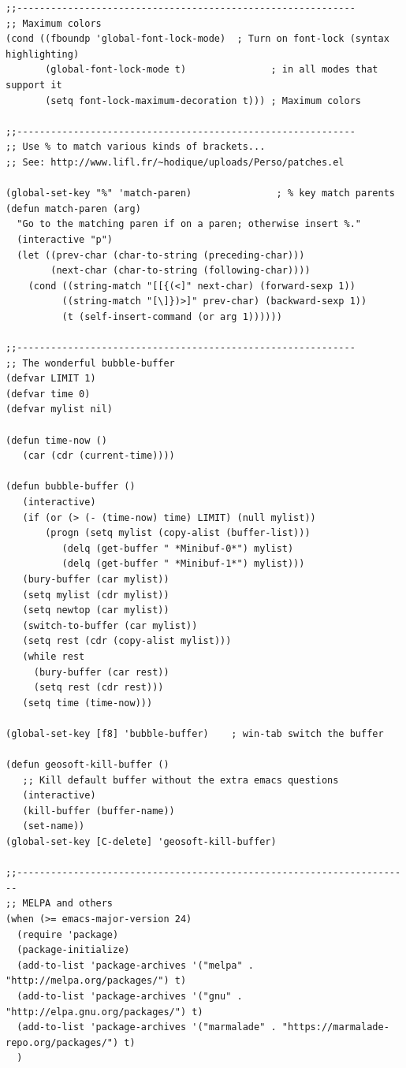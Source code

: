 \documentclass[12pt,spanish,]{article}
\begin{document}
\begin{verbatim}
;;------------------------------------------------------------
;; Maximum colors
(cond ((fboundp 'global-font-lock-mode)  ; Turn on font-lock (syntax highlighting)
       (global-font-lock-mode t)               ; in all modes that support it
       (setq font-lock-maximum-decoration t))) ; Maximum colors

;;------------------------------------------------------------
;; Use % to match various kinds of brackets...
;; See: http://www.lifl.fr/~hodique/uploads/Perso/patches.el

(global-set-key "%" 'match-paren)               ; % key match parents
(defun match-paren (arg)
  "Go to the matching paren if on a paren; otherwise insert %."
  (interactive "p")
  (let ((prev-char (char-to-string (preceding-char)))
        (next-char (char-to-string (following-char))))
    (cond ((string-match "[[{(<]" next-char) (forward-sexp 1))
          ((string-match "[\]})>]" prev-char) (backward-sexp 1))
          (t (self-insert-command (or arg 1))))))

;;------------------------------------------------------------
;; The wonderful bubble-buffer
(defvar LIMIT 1)
(defvar time 0)
(defvar mylist nil)

(defun time-now ()
   (car (cdr (current-time))))

(defun bubble-buffer ()
   (interactive)
   (if (or (> (- (time-now) time) LIMIT) (null mylist))
       (progn (setq mylist (copy-alist (buffer-list)))
          (delq (get-buffer " *Minibuf-0*") mylist)
          (delq (get-buffer " *Minibuf-1*") mylist)))
   (bury-buffer (car mylist))
   (setq mylist (cdr mylist))
   (setq newtop (car mylist))
   (switch-to-buffer (car mylist))
   (setq rest (cdr (copy-alist mylist)))
   (while rest
     (bury-buffer (car rest))
     (setq rest (cdr rest)))
   (setq time (time-now))) 

(global-set-key [f8] 'bubble-buffer)    ; win-tab switch the buffer

(defun geosoft-kill-buffer ()
   ;; Kill default buffer without the extra emacs questions
   (interactive)
   (kill-buffer (buffer-name))
   (set-name)) 
(global-set-key [C-delete] 'geosoft-kill-buffer) 

;;----------------------------------------------------------------------
;; MELPA and others
(when (>= emacs-major-version 24)
  (require 'package)
  (package-initialize)
  (add-to-list 'package-archives '("melpa" . "http://melpa.org/packages/") t)
  (add-to-list 'package-archives '("gnu" . "http://elpa.gnu.org/packages/") t)
  (add-to-list 'package-archives '("marmalade" . "https://marmalade-repo.org/packages/") t)
  )


\end{verbatim}
\end{document}
